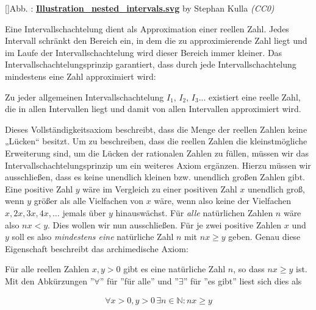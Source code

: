 \documentclass[fontsize=9pt,
               parskip=half-,
               DIV=14,
               listof=chapterentry,
               tocflat]{scrbook}
\newcounter{imagelabel}
\begin{document}
[]{Abb. : \protect\href{https://commons.wikimedia.org/wiki/File:Illustration_nested_intervals.svg}{\textbf{Illustration\allowbreak\_nested\allowbreak\_intervals.svg}} by Stephan Kulla \textit{(CC0)}}\begin{center}
\end{center}

Eine Intervallschachtelung dient als Approximation einer reellen Zahl. Jedes Intervall schränkt den Bereich ein, in dem die zu approximierende Zahl liegt und im Laufe der Intervallschachtelung wird dieser Bereich immer kleiner. Das Intervallschachtelungsprinzip garantiert, dass durch jede Intervallschachtelung mindestens eine Zahl approximiert wird:

\begin{definition*}
Zu jeder allgemeinen Intervallschachtelung $I_{1}$, $I_{2}$, $I_{3}$... existiert eine reelle Zahl, die in allen Intervallen liegt und damit von allen Intervallen approximiert wird.

\end{definition*}

Dieses Vollständigkeitsaxiom beschreibt, dass die Menge der reellen Zahlen keine „Lücken“ besitzt. Um zu beschreiben, dass die reellen Zahlen die kleinstmögliche Erweiterung sind, um die Lücken der rationalen Zahlen zu füllen, müssen wir das Intervallschachtelungsprinzip um ein weiteres Axiom ergänzen. Hierzu müssen wir ausschließen, dass es keine unendlich kleinen bzw. unendlich großen Zahlen gibt. Eine positive Zahl $y$ wäre im Vergleich zu einer positiven Zahl $x$ unendlich groß, wenn $y$ größer als alle Vielfachen von $x$ wäre, wenn also keine der Vielfachen $x,2x,3x,4x,\ldots $ jemals über $y$ hinauswächst. Für \emph{alle} natürlichen Zahlen $n$ wäre also $nx<y$. Dies wollen wir nun ausschließen. Für je zwei positive Zahlen $x$ und $y$ soll es also \emph{mindestens eine} natürliche Zahl $n$ mit $nx\geq y$ geben. Genau diese Eigenschaft beschreibt das archimedische Axiom:

\begin{definition*}
Für alle reellen Zahlen $x,y>0$ gibt es eine natürliche Zahl $n$, so dass $nx\geq y$ ist. Mit den Abkürzungen {''}$\forall ${''} für {''}für alle{''} und {''}$\exists ${''} für {''}es gibt{''} liest sich dies als

\begin{align*}
\forall x>0,y>0\,\exists n\in \mathbb {N} :nx\geq y
\end{align*}

\end{definition*}
\end{document}
